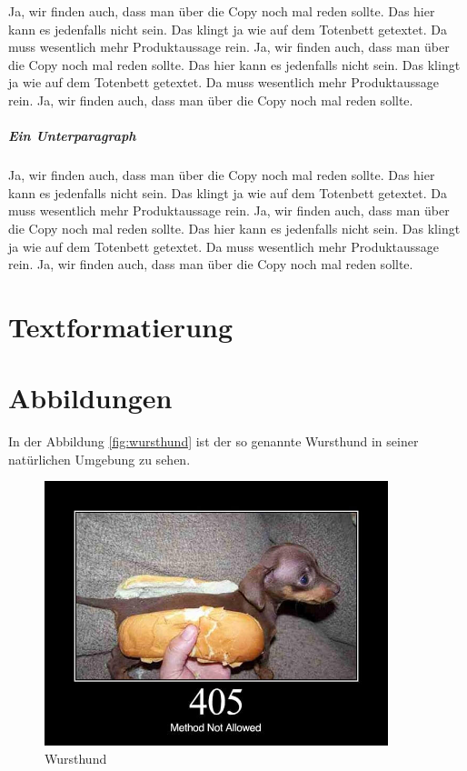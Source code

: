 Ja, wir finden auch, dass man über die Copy noch mal reden sollte. Das hier kann es jedenfalls nicht sein. Das klingt ja wie auf dem Totenbett getextet. Da muss wesentlich mehr Produktaussage rein. Ja, wir finden auch, dass man über die Copy noch mal reden sollte. Das hier kann es jedenfalls nicht sein. Das klingt ja wie auf dem Totenbett getextet. Da muss wesentlich mehr Produktaussage rein. Ja, wir finden auch, dass man über die Copy noch mal reden sollte.

\subparagraph{Ein Unterparagraph}

Ja, wir finden auch, dass man über die Copy noch mal reden sollte. Das hier kann es jedenfalls nicht sein. Das klingt ja wie auf dem Totenbett getextet. Da muss wesentlich mehr Produktaussage rein. Ja, wir finden auch, dass man über die Copy noch mal reden sollte. Das hier kann es jedenfalls nicht sein. Das klingt ja wie auf dem Totenbett getextet. Da muss wesentlich mehr Produktaussage rein. Ja, wir finden auch, dass man über die Copy noch mal reden sollte.

\section{Textformatierung}

\section{Abbildungen}

In der Abbildung \vref{fig:wursthund} ist der so genannte Wursthund in seiner natürlichen Umgebung zu sehen.

\begin{figure}[htbp]
	\centering
	\includegraphics[width=10cm]{bilder/wursthund.jpg}
	\caption{Wursthund}
	\label{fig:wursthund}
\end{figure}

